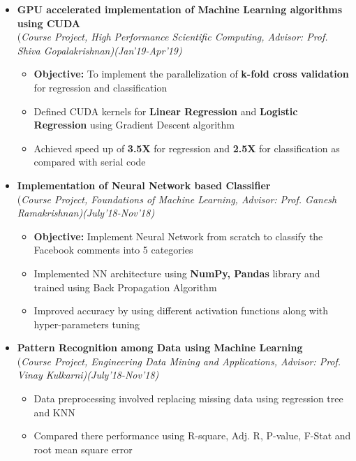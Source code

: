 \documentclass[a4paper,10pt]{article}
\newcommand{\isep}{-2 pt}
\begin{document}
\begin{itemize}
\item \textbf{GPU accelerated implementation of Machine Learning algorithms using CUDA} \\
(\emph{Course Project, High Performance Scientific Computing, Advisor: Prof. Shiva Gopalakrishnan)\hfill (Jan'19-Apr'19)}
    \\ [-0.6cm]
    \begin{itemize}\itemsep \isep
    \item \textbf{Objective:} To implement the parallelization of \textbf{k-fold cross validation} for regression and classification
    \item Defined CUDA kernels for \textbf{Linear Regression} and \textbf{Logistic Regression} using Gradient Descent algorithm
    \item Achieved speed up of  \textbf{3.5X} for regression and \textbf{2.5X} for classification as compared with serial code
    \end{itemize}

\item \textbf{Implementation of Neural Network based Classifier} \\ 
(\emph{Course Project, Foundations of Machine Learning, Advisor: Prof. Ganesh Ramakrishnan)\hfill (July'18-Nov'18)}
    \\ [-0.6cm]
    \begin{itemize}\itemsep \isep
   \item \textbf{Objective:} Implement Neural Network from scratch to classify the Facebook comments into 5 categories %
    \item Implemented NN architecture using \textbf{NumPy, Pandas} library and trained using Back Propagation Algorithm
    \item Improved accuracy by using different activation functions along with hyper-parameters tuning
\end{itemize}
\newpage
\item \textbf{Pattern Recognition among Data using Machine Learning}\\ 
(\emph{Course Project, Engineering Data Mining and Applications, Advisor: Prof. Vinay Kulkarni)\hfill (July'18-Nov'18)}
\\[-0.6cm]
    \begin{itemize}\itemsep \isep
    \item Data preprocessing involved replacing missing data using regression tree
    and KNN 
    \item  Compared there performance using R-square, Adj. R, P-value, F-Stat and root mean square error
    \end{itemize}
\end{itemize}
\end{document}
